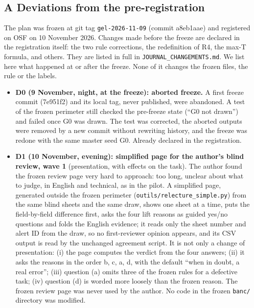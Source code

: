 \subsection{A Deviations from the pre-registration}\label{a-deviations-from-the-pre-registration}

The plan was frozen at git tag \texttt{gel-2026-11-09} (commit a8eb1aae) and registered on OSF on 10 November 2026. Changes made before the freeze are declared in the registration itself: the two rule corrections, the redefinition of R4, the max-T formula, and others. They are listed in full in \texttt{JOURNAL\_\allowbreak{}CHANGEMENTS.\allowbreak{}md}. We list here what happened at or after the freeze. None of it changes the frozen files, the rule or the labels.

\begin{itemize}
\tightlist
\item
  \textbf{D0 (9 November, night, at the freeze): aborted freeze.} A first freeze commit (7e951f2) and its local tag, never published, were abandoned. A test of the frozen perimeter still checked the pre-freeze state (``G0 not drawn'') and failed once G0 was drawn. The test was corrected, the aborted outputs were removed by a new commit without rewriting history, and the freeze was redone with the same master seed G0. Already declared in the registration.
\item
  \textbf{D1 (10 November, evening): simplified page for the author's blind review, wave 1} (presentation, with effects on the task). The author found the frozen review page very hard to approach: too long, unclear about what to judge, in English and technical, as in the pilot. A simplified page, generated outside the frozen perimeter (\texttt{outils/\allowbreak{}relecture\_\allowbreak{}simple.\allowbreak{}py}) from the same blind sheets and the same draw, shows one sheet at a time, puts the field-by-field difference first, asks the four lift reasons as guided yes/no questions and folds the English evidence; it reads only the sheet number and alert ID from the draw, so no first-reviewer opinion appears, and its CSV output is read by the unchanged agreement script. It is not only a change of presentation: (i) the page computes the verdict from the four answers; (ii) it asks the reasons in the order b, c, a, d, with the default ``when in doubt, a real error''; (iii) question (a) omits three of the frozen rules for a defective task; (iv) question (d) is worded more loosely than the frozen reason. The frozen review page was never used by the author. No code in the frozen \texttt{banc/} directory was modified.

\end{itemize}

